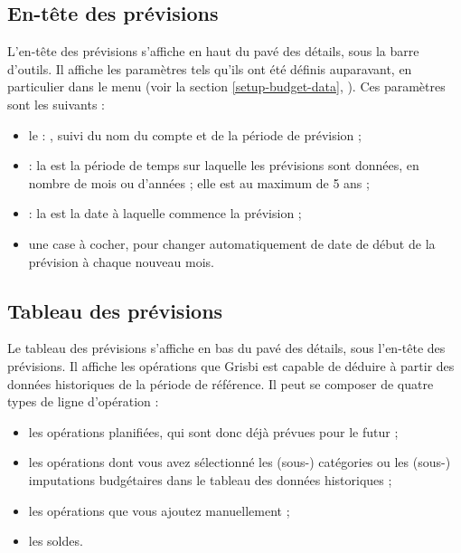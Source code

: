 \subsection{En-tête des prévisions\label{budget-estimate-summary}}

L'en-tête des prévisions s'affiche en haut du pavé des détails, sous la barre d'outils. Il affiche les paramètres tels qu'ils ont été définis auparavant, en particulier dans le menu  (voir la section \vref{setup-budget-data}, ). Ces paramètres sont les suivants :
\begin{itemize}
	\item le   : , suivi du nom du compte et de la période de prévision ;
	\item {} : la  est la période de temps sur laquelle les prévisions sont données, en nombre de mois ou d'années ; elle est au maximum de 5 ans ;
	\item {} : la  est la date à laquelle commence la prévision ;
	\item une case à cocher, pour changer automatiquement de date de début de la prévision à chaque nouveau mois.
\end{itemize}


\subsection{Tableau des prévisions\label{budget-estimate-table}}

Le tableau des prévisions s'affiche en bas du pavé des détails, sous l'en-tête des prévisions. Il affiche les opérations que Grisbi est capable de déduire à partir des données historiques de la période de référence. Il peut se composer de quatre types de ligne d'opération : 
\begin{itemize}
	\item les opérations planifiées, qui sont donc déjà prévues pour le futur ;
	\item les opérations dont vous avez sélectionné les (sous-) catégories ou les (sous-) imputations budgétaires dans le tableau des données historiques ; 
	\item les opérations que vous ajoutez manuellement ;
	\item les soldes.
\end{itemize}

